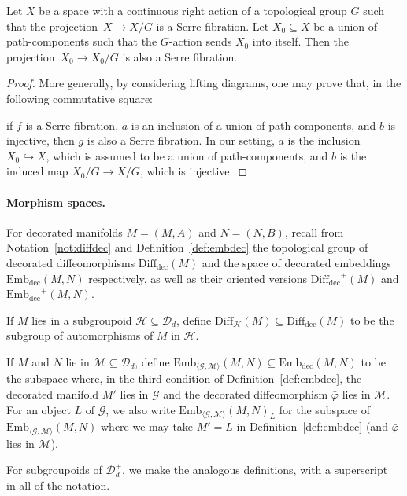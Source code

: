 \documentclass[AHL,Unicode,published]{cedram}
\newcommand{\Diff}{\mathrm{Diff}}
\newcommand{\rdec}{\mathrm{dec}}
\newcommand{\cD}{\mathcal{D}}
\newcommand{\cG}{\mathcal{G}}
\newcommand{\cH}{\mathcal{H}}
\newcommand{\cM}{\mathcal{M}}
\newcommand{\diffdec}{\ensuremath{\mathrm{Diff}_{\rdec}}}
\newcommand{\embdec}{\ensuremath{\mathrm{Emb}_{\rdec}}}
\newcommand{\embgm}{\ensuremath{\mathrm{Emb}_{\langle \cG,\cM \rangle}}}
\begin{document}
\begin{lemm}\label{lem:Serre-fibration-path-components}
Let $X$ be a space with a continuous right action of a topological group $G$ such that the projection~$X \to X/G$ is a Serre fibration. Let $X_{0} \subseteq X$ be a union of path-components such that the $G$-action sends $X_{0}$ into itself. Then the projection~$X_{0} \to X_{0}/G$ is also a Serre fibration.
\end{lemm}
\begin{proof}
More generally, by considering lifting diagrams, one may prove that, in the following commutative square:
\begin{center}
\end{center} if $f$ is a Serre fibration, $a$ is an inclusion of a union of path-components, and $b$ is injective, then $g$ is also a Serre fibration. In our setting, $a$ is the inclusion $X_{0} \hookrightarrow X$, which is assumed to be a union of path-components, and $b$ is the induced map $X_{0}/G \to X/G$, which is injective.
\end{proof}


\paragraph*{Morphism spaces.}

For decorated manifolds $M = (M,A)$ and $N = (N,B)$, recall from Notation~\ref{not:diffdec} and Definition~\ref{def:embdec} the topological group of decorated diffeomorphisms $\diffdec(M)$ and the space of decorated embeddings $\embdec(M,N)$ respectively, as well as their oriented versions $\diffdec^{+}(M)$ and $\embdec^{+}(M,N)$.

\begin{defi}\label{def:diffdec-2}

If $M$ lies in a subgroupoid $\cH \subseteq \cD_{d}$, define $\Diff_{\cH}(M) \subseteq \diffdec(M)$ to be the subgroup of automorphisms of $M$ in $\cH$.

If $M$ and $N$ lie in $\cM \subseteq \cD_{d}$, define $\embgm(M,N) \subseteq \embdec(M,N)$ to be the subspace where, in the third condition of Definition~\ref{def:embdec}, the decorated manifold $M'$ lies in $\cG$ and the decorated diffeomorphism $\bar{\varphi}$ lies in $\cM$. For an object $L$ of $\cG$, we also write $\embgm(M,N)_L$ for the subspace of $\embgm(M,N)$ where we may take $M' = L$ in Definition~\ref{def:embdec} (and $\bar{\varphi}$ lies in $\cM$).

For subgroupoids of $\cD_{d}^{+}$, we make the analogous definitions, with a superscript ${}^{+}$ in all of the notation.
\end{defi}
\end{document}
